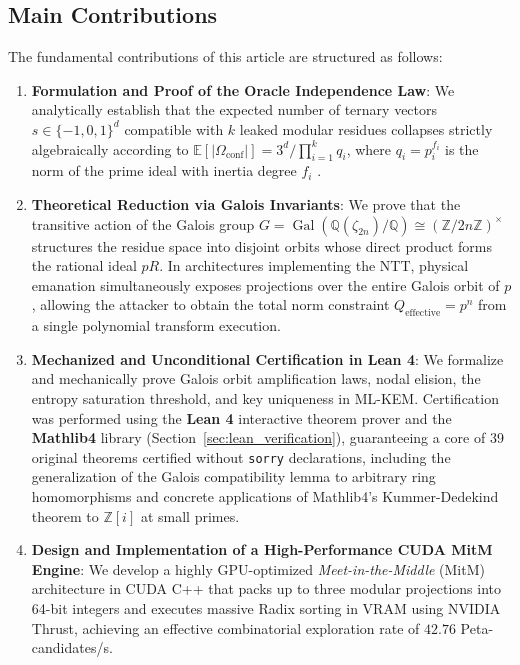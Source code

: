 \documentclass[11pt,a4paper]{article}
\theoremstyle{plain}
\theoremstyle{definition}
\numberwithin{equation}{section}
\newcommand{\QQ}{\mathbb{Q}}
\newcommand{\ZZ}{\mathbb{Z}}
\newcommand{\Gal}{\operatorname{Gal}}
\newcommand{\E}{\mathbb{E}}
\begin{document}
\subsection{Main Contributions}
The fundamental contributions of this article are structured as follows:

\begin{enumerate}
    \item \textbf{Formulation and Proof of the Oracle Independence Law}: We analytically establish that the expected number of ternary vectors $s \in \{-1,0,1\}^d$ compatible with $k$ leaked modular residues collapses strictly algebraically according to $\E[|\Omega_{\text{conf}}|] = 3^d / \prod_{i=1}^k q_i$, where $q_i = p_i^{f_i}$ is the norm of the prime ideal with inertia degree $f_i$ \cite{Peinador2026Repo}.
    
    \item \textbf{Theoretical Reduction via Galois Invariants}: We prove that the transitive action of the Galois group $G = \Gal(\QQ(\zeta_{2n})/\QQ) \cong (\ZZ/2n\ZZ)^\times$ structures the residue space into disjoint orbits whose direct product forms the rational ideal $pR$. In architectures implementing the NTT, physical emanation simultaneously exposes projections over the entire Galois orbit of $p$, allowing the attacker to obtain the total norm constraint $Q_{\text{effective}} = p^n$ from a single polynomial transform execution.

    \item \textbf{Mechanized and Unconditional Certification in Lean 4}: We formalize and mechanically prove Galois orbit amplification laws, nodal elision, the entropy saturation threshold, and key uniqueness in ML-KEM. Certification was performed using the \textbf{Lean 4} interactive theorem prover \cite{Moura2021} and the \textbf{Mathlib4} library \cite{Mathlib2020} (Section~\ref{sec:lean_verification}), guaranteeing a core of 39 original theorems certified without \texttt{sorry} declarations, including the generalization of the Galois compatibility lemma to arbitrary ring homomorphisms and concrete applications of Mathlib4's Kummer-Dedekind theorem to $\ZZ[i]$ at small primes.
    
    \item \textbf{Design and Implementation of a High-Performance CUDA MitM Engine}: We develop a highly GPU-optimized \emph{Meet-in-the-Middle} (MitM) architecture in CUDA C++ that packs up to three modular projections into 64-bit integers and executes massive Radix sorting in VRAM using NVIDIA Thrust, achieving an effective combinatorial exploration rate of $42.76$ Peta-candidates/s.


\end{enumerate}
\end{document}
